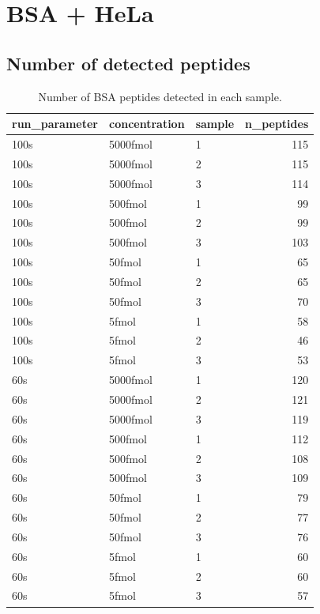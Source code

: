 \documentclass[]{article}
\begin{document}
\hypertarget{bsa-hela}{%
\section{BSA + HeLa}\label{bsa-hela}}

\hypertarget{number-of-detected-peptides-1}{%
\subsection{Number of detected peptides}\label{number-of-detected-peptides-1}}

\begin{table}

\caption{\label{tab:tbl2}Number of BSA peptides detected in each sample.}
\centering
\begin{tabular}[t]{l|l|l|r}
\hline
run\_parameter & concentration & sample & n\_peptides\\
\hline
100s & 5000fmol & 1 & 115\\
\hline
100s & 5000fmol & 2 & 115\\
\hline
100s & 5000fmol & 3 & 114\\
\hline
100s & 500fmol & 1 & 99\\
\hline
100s & 500fmol & 2 & 99\\
\hline
100s & 500fmol & 3 & 103\\
\hline
100s & 50fmol & 1 & 65\\
\hline
100s & 50fmol & 2 & 65\\
\hline
100s & 50fmol & 3 & 70\\
\hline
100s & 5fmol & 1 & 58\\
\hline
100s & 5fmol & 2 & 46\\
\hline
100s & 5fmol & 3 & 53\\
\hline
60s & 5000fmol & 1 & 120\\
\hline
60s & 5000fmol & 2 & 121\\
\hline
60s & 5000fmol & 3 & 119\\
\hline
60s & 500fmol & 1 & 112\\
\hline
60s & 500fmol & 2 & 108\\
\hline
60s & 500fmol & 3 & 109\\
\hline
60s & 50fmol & 1 & 79\\
\hline
60s & 50fmol & 2 & 77\\
\hline
60s & 50fmol & 3 & 76\\
\hline
60s & 5fmol & 1 & 60\\
\hline
60s & 5fmol & 2 & 60\\
\hline
60s & 5fmol & 3 & 57\\
\hline
\end{tabular}
\end{table}
\end{document}
